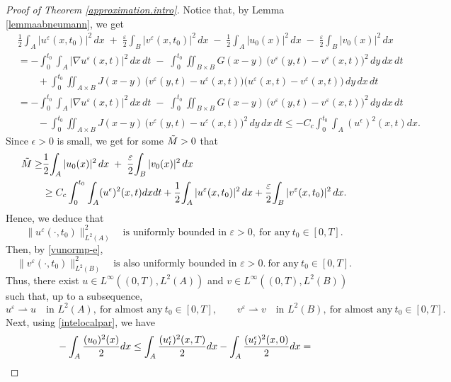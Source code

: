 \documentclass[reqno]{amsart}
\numberwithin{equation}{section}
\begin{document}
\begin{proof}[Proof of Theorem \ref{approximation.intro}]
Notice that, by Lemma \ref{lemmaabneumann}, we get
\begin{align*}
&\frac12\!\int_A |u^\varepsilon(x,{t_0})|^2\,dx
\;+\;
\frac{\varepsilon}{2}\!\int_B |v^\varepsilon(x,{t_0})|^2\,dx
\;-\;
\frac12\!\int_A |u_0(x)|^2\,dx
\;-\;
\frac{\varepsilon}{2}\!\int_B |v_0(x)|^2\,dx
\\[0.6em]
&=
-\int_{0}^{{t_0}}\!\!\int_A |\nabla u^\varepsilon(x,t)|^2\,dx\,dt
\;-\;
\int_{0}^{{t_0}}\!\!\iint_{B\times B}
   G(x-y)\,\big( v^\varepsilon(y,t)-v^\varepsilon(x,t) \big)^2
\,dy\,dx\,dt
\\
&\qquad
+\int_{0}^{{t_0}}\!\!\iint_{A\times B}
   J(x-y)\,\big( v^\varepsilon(y,t)-u^\varepsilon(x,t) \big)
           \big( u^\varepsilon(x,t)-v^\varepsilon(x,t) \big)
\,dy\,dx\,dt
\\[0.6em]
&=
-\int_{0}^{{t_0}}\!\!\int_A |\nabla u^\varepsilon(x,t)|^2\,dx\,dt
\;-\;
\int_{0}^{{t_0}}\!\!\iint_{B\times B}
   G(x-y)\,\big( v^\varepsilon(y,t)-v^\varepsilon(x,t) \big)^2
\,dy\,dx\,dt
\\
&\qquad
-\int_{0}^{{t_0}}\!\!\iint_{A\times B}
   J(x-y)\,\big( v^\varepsilon(y,t)-u^\varepsilon(x,t) \big)^2
\,dy\,dx\,dt\leq -C_c\int_0^{t_0}\int_A (u^\epsilon)^2(x,t)dx.
\end{align*}
Since $\epsilon>0$ is small, we get for some $\Tilde{M}>0$ that
\begin{align*}
     \Tilde{M}\geq &
\frac12\!\int_A |u_0(x)|^2\,dx
\;+\;
\frac{\varepsilon}{2}\!\int_B |v_0(x)|^2\,dx \\ & \geq  C_c\int_0^{t_0}\int_A (u^\epsilon)^2(x,t)dxdt + \frac12\!\int_A |u^\varepsilon(x,{t_0})|^2\,dx
+
\frac{\varepsilon}{2}\!\int_B |v^\varepsilon(x,{t_0})|^2\,dx.
\end{align*}
Hence, we deduce that
\[ 
\|u^\varepsilon(\cdot,t_0)\|_{L^2(A)}^2
\quad\text{is uniformly bounded in }\varepsilon>0, \ \text{for any} \ t_0 \in [0,T].
\]
Then, by \eqref{vunormp-e},
\[
\|v^\varepsilon(\cdot,t_0)\|_{L^2(B)}^2
\quad\text{is also uniformly bounded in }\varepsilon>0.\ \text{for any} \ t_0 \in [0,T].
\]
Thus, there exist $u\in L^\infty ((0,T), L^2(A))$ and $v\in L^\infty ((0,T), L^2(B))$ such that, up to a subsequence,
\[
u^\varepsilon \rightharpoonup u \quad\text{in }L^2(A), \ \text{for almost any} \ t_0 \in [0,T], 
\qquad
v^\varepsilon \rightharpoonup v \quad\text{in }L^2(B), \ \text{for almost any} \ t_0 \in [0,T].
\]
\medskip
Next, using \eqref{intelocalpar}, we have
\begin{align*}
    &-\int_A \frac{(u_0)^2(x)}{2}dx\leq \int_A \frac{(u^\epsilon_t)^2(x,T)}{2}dx-\int_A \frac{(u^\epsilon_t)^2(x,0)}{2}dx=\notag \\

\end{align*}
\end{proof}
\end{document}
